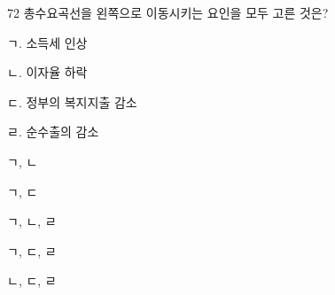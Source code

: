 \begin{question}{72}
총수요곡선을 왼쪽으로 이동시키는 요인을 모두 고른 것은?
\begin{framedtext}
ㄱ. 소득세 인상 \par
ㄴ. 이자율 하락 \par
ㄷ. 정부의 복지지출 감소 \par
ㄹ. 순수출의 감소 \par
\end{framedtext}
\begin{choices}
  \item ㄱ, ㄴ
  \item ㄱ, ㄷ
  \item ㄱ, ㄴ, ㄹ
  \item ㄱ, ㄷ, ㄹ
  \item ㄴ, ㄷ, ㄹ
\end{choices}
\end{question}
